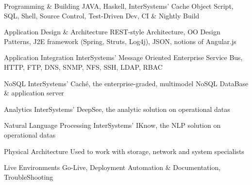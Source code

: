 

\begin{cvskills}

  \cvskill
    {Programming \& Building} %
    {JAVA, Haskell, InterSystems' Cache Object Script, SQL, Shell, Source Control, Test-Driven Dev, CI \& Nightly Build} %

  \cvskill
    {Application Design \& Architecture} %
    {REST-style Architecture, OO Design Patterns, J2E framework (Spring, Struts, Log4j), JSON, notions of Angular.js} %

  \cvskill
    {Application Integration} %
    {InterSystems' Message Oriented Enterprise Service Bus, HTTP, FTP, DNS, SNMP, NFS, SSH, LDAP, RBAC} %

  \cvskill
    {NoSQL} %
    {InterSystems' Caché, the enterprise-graded, multimodel NoSQL DataBase \& application server} %

  \cvskill
    {Analytics} %
    {InterSystems' DeepSee, the analytic solution on operational datas} %

  \cvskill
    {Natural Language Processing} %
    {InterSystems' IKnow, the NLP solution on operational datas} %

  \cvskill
    {Physical Architecture} %
    {Used to work with storage, network and system specialists} %

  \cvskill
    {Live Environments} %
    {Go-Live, Deployment Automation \& Documentation, TroubleShooting} %

\end{cvskills}
